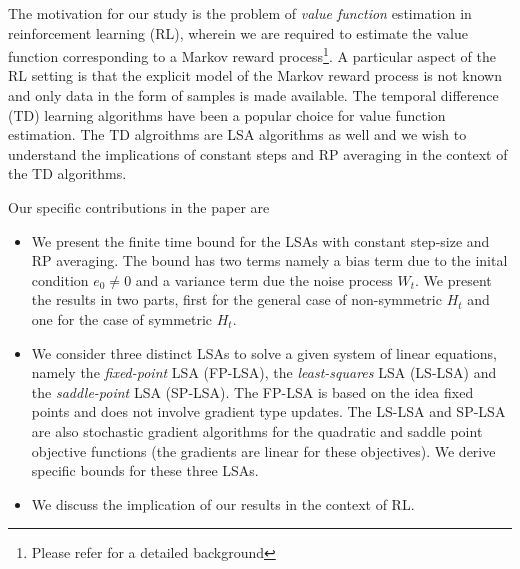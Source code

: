 The motivation for our study is the problem of \emph{value function} estimation in reinforcement learning (RL), wherein we are required to estimate the value function corresponding to a Markov reward process\footnote{Please refer \cite{BertB} for a detailed background}. A particular aspect of the RL setting is that the explicit model of the Markov reward process is not known and only data in the form of samples is made available. The temporal difference (TD) learning algorithms have been a popular choice for value function estimation. The TD algroithms are LSA algorithms as well and we wish to understand the implications of constant steps and RP averaging in the context of the TD algorithms.\par

Our specific contributions in the paper are
\begin{itemize}
\item We present the finite time bound for the LSAs with constant step-size and RP averaging. The bound has two terms namely a bias term due to the inital condition $e_0\neq 0$ and a variance term due the noise process $W_{t}$. We present the results in two parts, first for the general case of non-symmetric $H_t$ and one for the case of symmetric $H_t$.
\item We consider three distinct LSAs to solve a given system of linear equations, namely the \emph{fixed-point} LSA (FP-LSA), the \emph{least-squares} LSA (LS-LSA) and the \emph{saddle-point} LSA (SP-LSA). The FP-LSA is based on the idea fixed points and does not involve gradient type updates.  The LS-LSA and SP-LSA are also stochastic gradient algorithms for the quadratic and saddle point objective functions (the gradients are linear for these objectives). We derive specific bounds for these three LSAs.
\item We discuss the implication of our results in the context of RL.
\end{itemize}
